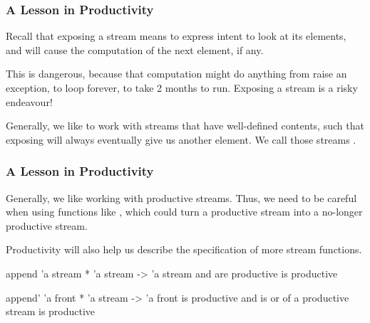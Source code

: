 \documentclass[aspectratio=169, handout]{beamer}
\begin{document}
\begin{frame}[fragile]
  \frametitle{A Lesson in Productivity}

  Recall that exposing a stream means to express intent to look at its elements,
  and will cause the computation of the next element, if any.

  \pause
  \vspace{\fill}

  This is dangerous, because that computation might do anything from raise an
  exception, to loop forever, to take 2 months to run. Exposing a stream is a
  risky endeavour!

  \pause
  \vspace{\fill}

  Generally, we like to work with streams that have well-defined contents, such
  that exposing will always eventually give us another element. We call those
  streams .

  \pause
  \vspace{\fill}

\end{frame}


\begin{frame}[fragile]
  \frametitle{A Lesson in Productivity}

  Generally, we like working with productive streams. Thus, we need to be
  careful when using functions like , which could turn a productive
  stream into a no-longer productive stream.

  \pause
  \vspace{\fill}

  Productivity will also help us describe the specification of more stream
  functions.

  \pause
  \vspace{\fill}

  \spec
    {append}
    {'a stream * 'a stream -> 'a stream}
    { and  are productive}
    { is productive}

  \pause
  \vspace{\fill}

  \spec
    {append'}
    {'a front * 'a stream -> 'a front}
    { is productive and  is  or  of a productive stream}
    { is productive}
\end{frame}
\end{document}
